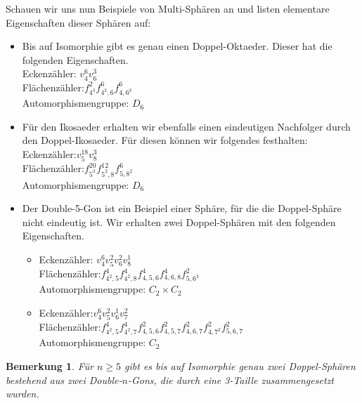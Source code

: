 \documentclass[12pt,titlepage,twoside,cleardoublepage]{article}
\theoremstyle{nummermitklammern}
\newtheorem{bemerkung}[temp]{Bemerkung}
\newtheorem{bemerkung}[zahl]{Bemerkung}
\numberwithin{equation}{section}
\begin{document}
Schauen wir uns nun Beispiele von Multi-Sphären an und listen elementare Eigenschaften dieser Sphären auf:
\begin{itemize}
\item Bis auf Isomorphie gibt es genau einen Doppel-Oktaeder. Dieser hat die folgenden Eigenschaften.\\
Eckenzähler: $v_4^6v_6^3$\\
Flächenzähler:$f_{4^3}^2f_{4^2,6}^6f_{4,6^2}^6$\\
Automorphismengruppe: $D_6$\\ 
\item Für den Ikosaeder erhalten wir ebenfalls einen eindeutigen Nachfolger durch den Doppel-Ikosaeder. Für diesen können wir folgendes festhalten:\\
Eckenzähler:$v_5^{18}v_8^3$\\
Flächenzähler:$f_{5^3}^{20}f_{5^2,8}^{12}f^6_{5,8^2}$\\
Automorphismengruppe: $D_6$\\
\item 
Der Double-5-Gon ist ein Beispiel einer Sphäre, für die die Doppel-Sphäre nicht eindeutig ist. Wir erhalten zwei Doppel-Sphären mit den folgenden Eigenschaften.\\
\begin{itemize}
\item Eckenzähler: $v_4^6v_5^2v_6^2v_8^1$\\
Flächenzähler:$f_{4^2,5}^4f^4_{4^2,8}f^4_{4,5,6}f^4_{4,6,8}f^2_{5,6^2}$\\
Automorphismengruppe: $C_2\times C_2$\\
\item 
Eckenzähler:$v_4^6v_5^2v_6^1v_7^2$\\
Flächenzähler:$f_{4^2,5}^4f^4_{4^2,7}f^2_{4,5,6}f^2_{4,5,7}f^2_{4,6,7}f^2_{4,7^2}f^2_{5,6,7}$\\
Automorphismengruppe: $C_2$\\
\end{itemize}
\end{itemize}
\begin{bemerkung}
Für $n\geq 5$ gibt es bis auf Isomorphie genau zwei Doppel-Sphären bestehend aus zwei Double-$n$-Gons, die durch eine 3-Taille zusammengesetzt wurden.
\end{bemerkung}
\end{document}

